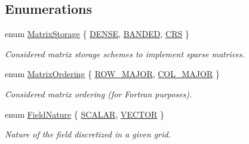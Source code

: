 \subsection*{Enumerations}
\begin{DoxyCompactItemize}
\item 
enum \hyperlink{group__c02-enums_ga25b67ec6a2afeee69f9bb196a9c66619}{Matrix\-Storage} \{ \hyperlink{group__c02-enums_ga25b67ec6a2afeee69f9bb196a9c66619a00a806d43a7d74e9ccca47a2134e9c87}{D\-E\-N\-S\-E}, 
\hyperlink{group__c02-enums_ga25b67ec6a2afeee69f9bb196a9c66619aef1d4271d5005282978a3a40a8a52c9b}{B\-A\-N\-D\-E\-D}, 
\hyperlink{group__c02-enums_ga25b67ec6a2afeee69f9bb196a9c66619a87619d374775e937bca967402b988b8b}{C\-R\-S}
 \}
\begin{DoxyCompactList}\small\item\em Considered matrix storage schemes to implement sparse matrices. \end{DoxyCompactList}\item 
enum \hyperlink{group__c02-enums_ga622801bd9f912d0f976c3e383f5f581c}{Matrix\-Ordering} \{ \hyperlink{group__c02-enums_ga622801bd9f912d0f976c3e383f5f581cabc55178ac16eb1ce89b5f3ab915a91f3}{R\-O\-W\-\_\-\-M\-A\-J\-O\-R}, 
\hyperlink{group__c02-enums_ga622801bd9f912d0f976c3e383f5f581ca7c11989c132253fb76b8f6b1314f7e13}{C\-O\-L\-\_\-\-M\-A\-J\-O\-R}
 \}
\begin{DoxyCompactList}\small\item\em Considered matrix ordering (for Fortran purposes). \end{DoxyCompactList}\item 
enum \hyperlink{group__c02-enums_ga4c54f2a329cfb4e56213b02a259d19e2}{Field\-Nature} \{ \hyperlink{group__c02-enums_ga4c54f2a329cfb4e56213b02a259d19e2af481d45bd70d41381c7d72e200889205}{S\-C\-A\-L\-A\-R}, 
\hyperlink{group__c02-enums_ga4c54f2a329cfb4e56213b02a259d19e2a3d8cb27a993651a74d67fb8c98ae91b2}{V\-E\-C\-T\-O\-R}
 \}
\begin{DoxyCompactList}\small\item\em Nature of the field discretized in a given grid. \end{DoxyCompactList}\end{DoxyCompactItemize}
